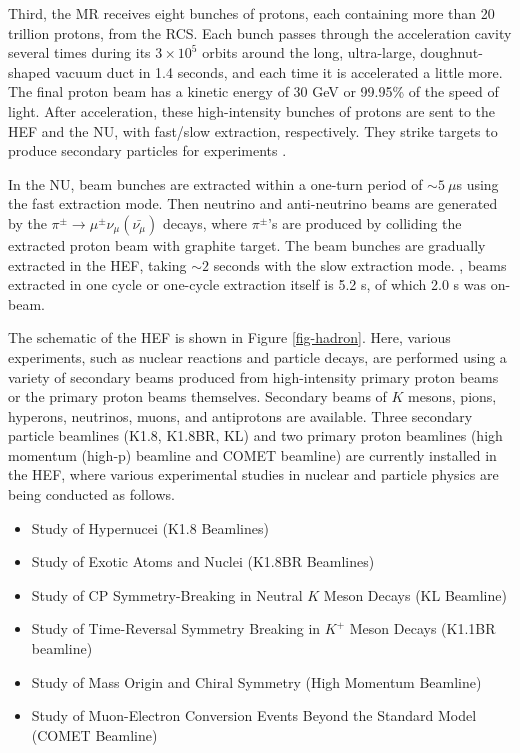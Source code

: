 Third, the MR receives eight bunches of protons, each containing more than 20 trillion protons, from the RCS. Each bunch passes through the acceleration cavity several times during its $3\times10^5$ orbits around the long, ultra-large, doughnut-shaped vacuum duct in 1.4 seconds, and each time it is accelerated a little more. The final proton beam has a kinetic energy of 30 GeV or 99.95\% of the speed of light. After acceleration, these high-intensity bunches of protons are sent to the HEF and the NU, with fast/slow extraction, respectively. They strike targets to produce secondary particles for experiments \cite{J-PARCsite}. 

In the NU, beam bunches are extracted within a one-turn period of $\sim5\ \mu$s using the fast extraction mode. Then neutrino and anti-neutrino beams are generated by the $\pi^{\pm}\to\mu^{\pm}\nu_{\mu} (\bar{\nu_{\mu}})$ decays, where $\pi^{\pm}$'s are produced by colliding the extracted proton beam with graphite target. The beam bunches are gradually extracted in the HEF, taking $\sim2$ seconds with the slow extraction mode. , beams extracted in one cycle or one-cycle extraction itself is 5.2 s, of which 2.0 s was on-beam.

The schematic of the HEF is shown in Figure \ref{fig-hadron}. Here, various experiments, such as nuclear reactions and particle decays, are performed using a variety of secondary beams produced from high-intensity primary proton beams or the primary proton beams themselves. Secondary beams of $K$ mesons, pions, hyperons, neutrinos, muons, and antiprotons are available. Three secondary particle beamlines (K1.8, K1.8BR, KL) and two primary proton beamlines (high momentum (high-p) beamline and COMET beamline) are currently installed in the HEF, where various experimental studies in nuclear and particle physics are being conducted as follows. 
\begin{itemize}
\item Study of Hypernucei (K1.8 Beamlines)
\item Study of Exotic Atoms and Nuclei (K1.8BR Beamlines)
\item Study of CP Symmetry-Breaking in Neutral $K$ Meson Decays (KL Beamline)
\item Study of Time-Reversal Symmetry Breaking in $K^+$ Meson Decays (K1.1BR beamline)
\item Study of Mass Origin and Chiral Symmetry (High Momentum Beamline)
\item Study of Muon-Electron Conversion Events Beyond the Standard Model (COMET Beamline)
\end{itemize}

